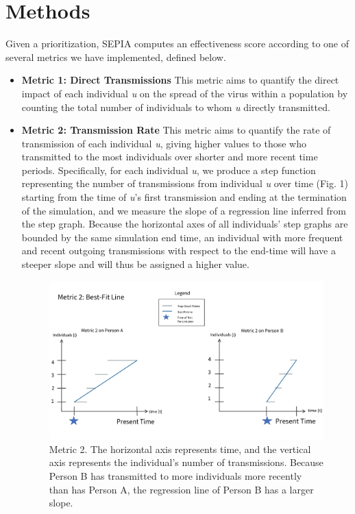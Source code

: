 \documentclass[twocolumn]{bmcart}%
\begin{document}
\section*{Methods}
Given a prioritization, SEPIA computes an effectiveness score according to one of several metrics we have implemented, defined below.
\newline
\begin{itemize}

\item \textbf{Metric 1: Direct Transmissions} This metric aims to quantify the direct impact of each individual \textit{u} on the spread of the virus within a population by counting the total number of individuals to whom \textit{u} directly transmitted.\newline

\item \textbf{Metric 2: Transmission Rate} This metric aims to quantify the rate of transmission of each individual \textit{u}, giving higher values to those who transmitted to the most individuals over shorter and more recent time periods.
Specifically, for each individual \textit{u}, we produce a step function representing the number of transmissions from individual \textit{u} over time (Fig. 1) starting from the time of \textit{u}'s first transmission and ending at the termination of the simulation, and we measure the slope of a regression line inferred from the step graph. Because the horizontal axes of all individuals' step graphs are bounded by the same simulation end time, an individual with more frequent and recent outgoing transmissions with respect to the end-time will have a steeper slope and will thus be assigned a higher value.\newline

\begin{figure}[h!]
\centering
\includegraphics[scale=0.17]{Figures/SEPIA Best-Fit line.png}
\caption{
\newline
Metric 2. The horizontal axis represents time, and the vertical axis represents the individual's number of transmissions. Because Person B has transmitted to more individuals more recently than has Person A, the regression line of Person B has a larger slope.
}
\end{figure}


\end{itemize}
\end{document}
